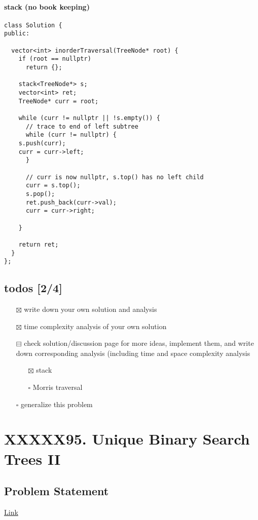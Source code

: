 \documentclass[12pt]{article}
\begin{document}
\paragraph{stack (no book keeping)}
\label{sec:org3718aca}
\begin{verbatim}
class Solution {
public:

  vector<int> inorderTraversal(TreeNode* root) {
    if (root == nullptr)
      return {};

    stack<TreeNode*> s;
    vector<int> ret;
    TreeNode* curr = root;

    while (curr != nullptr || !s.empty()) {
      // trace to end of left subtree
      while (curr != nullptr) {
	s.push(curr);
	curr = curr->left;
      }

      // curr is now nullptr, s.top() has no left child
      curr = s.top();
      s.pop();    
      ret.push_back(curr->val);
      curr = curr->right;

    }

    return ret;
  }
};
\end{verbatim}
\subsection{todos [2/4]}
\label{sec:org983fc26}
\begin{itemize}
\item[{$\boxtimes$}] write down your own solution and analysis
\item[{$\boxtimes$}] time complexity analysis of your own solution
\item[{$\boxminus$}] check solution/discussion page for more ideas, implement them, and write down corresponding analysis (including time and space complexity analysis
\begin{itemize}
\item[{$\boxtimes$}] stack
\item[{$\square$}] Morris traversal
\end{itemize}
\item[{$\square$}] generalize this problem
\end{itemize}
\section{XXXXX95. Unique Binary Search Trees II}
\label{sec:orgfcfa936}
\subsection{Problem Statement}
\label{sec:org6331e0d}
\href{https://leetcode.com/problems/unique-binary-search-trees-ii/}{Link}
\end{document}
